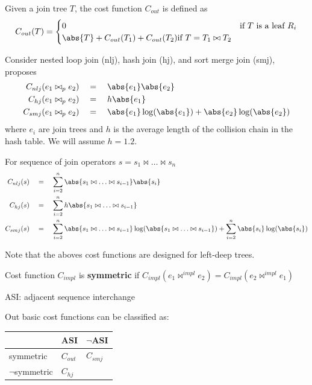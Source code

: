 \documentclass[11pt]{article}
\begin{document}
Given a join tree \(T\), the cost function \(C_{out}\) is defined as
\begin{equation*}
C_{out}(T)=
\begin{cases}
0&\text{if $T$ is a leaf }R_i\\
\abs{T}+C_{out}(T_1)+C_{out}(T_2)\text{if }T=T_1\bowtie T_2
\end{cases}
\end{equation*}

Consider nested loop join (nlj), hash join (hj), and sort merge join (smj),
\cite{10.5555/645913.671481} proposes
\begin{align*}
C_{nlj}(e_1\bowtie_pe_2)&\quad=\quad\abs{e_1}\abs{e_2}\\
C_{hj}(e_1\bowtie_pe_2)&\quad=\quad h\abs{e_1}\\
C_{smj}(e_1\bowtie_pe_2)&\quad=\quad\abs{e_1}\log(\abs{e_1})+\abs{e_2}\log(\abs{e_2})
\end{align*}
where \(e_i\) are join trees and \(h\) is the average length of the collision chain in the hash table. We
will assume \(h=1.2\).

For sequence of join operators \(s=s_1\bowtie\dots\bowtie s_n\)
\begin{align*}
C_{nlj}(s)&\quad=\quad\sum_{i=2}^n\abs{s_1\bowtie\dots\bowtie s_{i-1}}\abs{s_i}\\
C_{hj}(s)&\quad=\quad\sum_{i=2}^nh\abs{s_1\bowtie\dots\bowtie s_{i-1}}\\
C_{smj}(s)&\quad=\quad\sum_{i=2}^n\abs{s_1\bowtie\dots\bowtie s_{i-1}}\log(\abs{s_1\bowtie\dots\bowtie s_{i-1}})+\sum_{i=2}^n\abs{s_i}\log(\abs{s_i})
\end{align*}
\begin{remark}[]
Note that the aboves cost functions are designed for left-deep trees.
\end{remark}

Cost function \(C_{impl}\) is \textbf{symmetric} if \(C_{impl}(e_{1}\bowtie^{impl}e_2)=C_{impl}(e_2\bowtie^{impl}e_1)\)

ASI: adjacent sequence interchange

Out basic cost functions can be classified as:
\begin{center}
\begin{tabular}{lll}
 & ASI & \(\neg\)ASI\\
\hline
symmetric & \(C_{out}\) & \(C_{smj}\)\\
\(\neg\)symmetric & \(C_{hj}\) & \\
\end{tabular}
\end{center}
\end{document}

